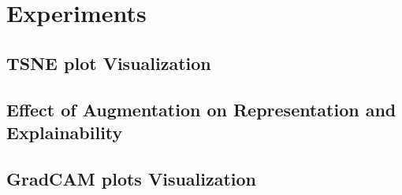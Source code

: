 \section{Experiments}
\label{sec:experiments}

\subsection{TSNE plot Visualization}

\subsection{Effect of Augmentation on Representation and Explainability}  

\subsection{GradCAM plots Visualization}
